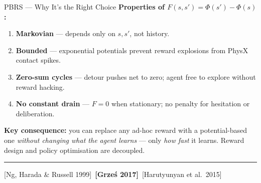 \documentclass[aspectratio=169,xcolor=dvipsnames,t]{beamer}
\newcommand{\litfooter}[1]{%
  \vspace{2pt}%
  \hrule%
  \vspace{2pt}%
  {\tiny\color{LightDarkGrey} #1}%
}
\begin{document}
\begin{frame}[t]{PBRS — Why It's the Right Choice}
  \textbf{Properties of $F(s,s') = \Phi(s') - \Phi(s)$:}
  \begin{enumerate}
    \item \textbf{Markovian} — depends only on $s,s'$, not history. 
    \item \textbf{Bounded} — exponential potentials prevent reward explosions from PhysX contact spikes.
    \item \textbf{Zero-sum cycles} — detour pushes net to zero; agent free to explore without reward hacking.
    \item \textbf{No constant drain} — $F{=}0$ when stationary; no penalty for hesitation or deliberation.
  \end{enumerate}

  \vspace{4pt}
  \textbf{Key consequence:} you can replace any ad-hoc reward with a potential-based one \emph{without changing what the agent learns} — only \emph{how fast} it learns. Reward design and policy optimisation are decoupled.

  \vfill\litfooter{[Ng, Harada \& Russell 1999]~\textbf{[Grze\'s 2017]}~[Harutyunyan et al.\ 2015]}
\end{frame}

\end{document}
